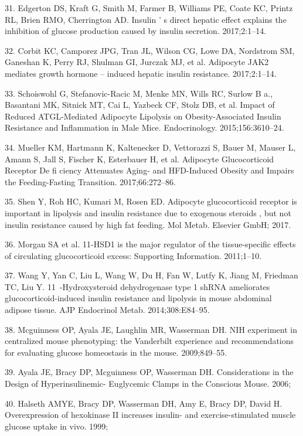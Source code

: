 \documentclass[11pt]{article} %
\begin{document}
31. Edgerton DS, Kraft G, Smith M, Farmer B, Williams PE, Coate KC,
Printz RL, Brien RMO, Cherrington AD. Insulin ' s direct hepatic effect
explains the inhibition of glucose production caused by insulin
secretion. 2017;2:1--14.

32. Corbit KC, Camporez JPG, Tran JL, Wilson CG, Lowe DA, Nordstrom SM,
Ganeshan K, Perry RJ, Shulman GI, Jurczak MJ, et al. Adipocyte JAK2
mediates growth hormone -- induced hepatic insulin resistance.
2017;2:1--14.

33. Schoiswohl G, Stefanovic-Racic M, Menke MN, Wills RC, Surlow B a.,
Basantani MK, Sitnick MT, Cai L, Yazbeck CF, Stolz DB, et al. Impact of
Reduced ATGL-Mediated Adipocyte Lipolysis on Obesity-Associated Insulin
Resistance and Inflammation in Male Mice. Endocrinology.
2015;156:3610--24.

34. Mueller KM, Hartmann K, Kaltenecker D, Vettorazzi S, Bauer M, Mauser
L, Amann S, Jall S, Fischer K, Esterbauer H, et al. Adipocyte
Glucocorticoid Receptor De fi ciency Attenuates Aging- and HFD-Induced
Obesity and Impairs the Feeding-Fasting Transition. 2017;66:272--86.

35. Shen Y, Roh HC, Kumari M, Rosen ED. Adipocyte glucocorticoid
receptor is important in lipolysis and insulin resistance due to
exogenous steroids , but not insulin resistance caused by high fat
feeding. Mol Metab. Elsevier GmbH; 2017.

36. Morgan SA et al. 11-HSD1 is the major regulator of the
tissue-specific effects of circulating glucocorticoid excess: Supporting
Information. 2011;1--10.

37. Wang Y, Yan C, Liu L, Wang W, Du H, Fan W, Lutfy K, Jiang M,
Friedman TC, Liu Y. 11~-Hydroxysteroid dehydrogenase type 1 shRNA
ameliorates glucocorticoid-induced insulin resistance and lipolysis in
mouse abdominal adipose tissue. AJP Endocrinol Metab. 2014;308:E84--95.

38. Mcguinness OP, Ayala JE, Laughlin MR, Wasserman DH. NIH experiment
in centralized mouse phenotyping: the Vanderbilt experience and
recommendations for evaluating glucose homeostasis in the mouse.
2009;849--55.

39. Ayala JE, Bracy DP, Mcguinness OP, Wasserman DH. Considerations in
the Design of Hyperinsulinemic- Euglycemic Clamps in the Conscious
Mouse. 2006;

40. Halseth AMYE, Bracy DP, Wasserman DH, Amy E, Bracy DP, David H.
Overexpression of hexokinase II increases insulin- and
exercise-stimulated muscle glucose uptake in vivo. 1999;
\end{document}
